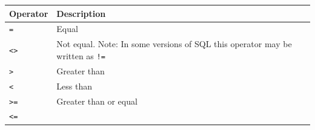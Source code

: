\documentclass[]{book}
\theoremstyle{definition}
\theoremstyle{definition}
\theoremstyle{remark}
\begin{document}
\begin{longtable}[]{@{}ll@{}}
\toprule
\begin{minipage}[b]{0.13\columnwidth}\raggedright\strut
Operator\strut
\end{minipage} & \begin{minipage}[b]{0.18\columnwidth}\raggedright\strut
Description\strut
\end{minipage}\tabularnewline
\midrule
\endhead
\begin{minipage}[t]{0.13\columnwidth}\raggedright\strut
\texttt{=}\strut
\end{minipage} & \begin{minipage}[t]{0.18\columnwidth}\raggedright\strut
Equal\strut
\end{minipage}\tabularnewline
\begin{minipage}[t]{0.13\columnwidth}\raggedright\strut
\texttt{\textless{}\textgreater{}}\strut
\end{minipage} & \begin{minipage}[t]{0.18\columnwidth}\raggedright\strut
Not equal. Note: In some versions of SQL this operator may be written as
\texttt{!=}\strut
\end{minipage}\tabularnewline
\begin{minipage}[t]{0.13\columnwidth}\raggedright\strut
\texttt{\textgreater{}}\strut
\end{minipage} & \begin{minipage}[t]{0.18\columnwidth}\raggedright\strut
Greater than\strut
\end{minipage}\tabularnewline
\begin{minipage}[t]{0.13\columnwidth}\raggedright\strut
\texttt{\textless{}}\strut
\end{minipage} & \begin{minipage}[t]{0.18\columnwidth}\raggedright\strut
Less than\strut
\end{minipage}\tabularnewline
\begin{minipage}[t]{0.13\columnwidth}\raggedright\strut
\texttt{\textgreater{}=}\strut
\end{minipage} & \begin{minipage}[t]{0.18\columnwidth}\raggedright\strut
Greater than or equal\strut
\end{minipage}\tabularnewline
\begin{minipage}[t]{0.13\columnwidth}\raggedright\strut
\texttt{\textless{}=}\strut
\end{minipage} & \begin{minipage}[t]{0.18\columnwidth}\raggedright\strut

\end{minipage}
\end{longtable}
\end{document}
